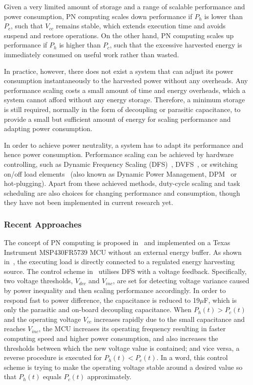 Given a very limited amount of storage and a range of scalable performance and power consumption, PN computing scales down performance if $P_h$ is lower than $P_c$, such that $V_{cc}$ remains stable, which extends execution time and avoids suspend and restore operations. On the other hand, PN computing scales up performance if $P_h$ is higher than $P_c$, such that the excessive harvested energy is immediately consumed on useful work rather than wasted.

In practice, however, there does not exist a system that can adjust its power consumption instantaneously to the harvested power without any overheads. Any performance scaling costs a small amount of time and energy overheads, which a system cannot afford without any energy storage. Therefore, a minimum storage is still required, normally in the form of decoupling or parasitic capacitance, to provide a small but sufficient amount of energy for scaling performance and adapting power consumption.

In order to achieve power neutrality, a system has to adapt its performance and hence power consumption. Performance scaling can be achieved by hardware controlling, such as Dynamic Frequency Scaling (DFS)~\cite{balsamo2016graceful}, DVFS~\cite{fletcher2017power}, or switching on/off load elements~\cite{wang2016storage, fletcher2017power} (also known as Dynamic Power Management, DPM~\cite{lu2000low} or hot-plugging). Apart from these achieved methods, duty-cycle scaling and task scheduling are also choices for changing performance and consumption, though they have not been implemented in current research yet.

\subsubsection{Recent Approaches}

The concept of PN computing is proposed in~\cite{balsamo2016graceful} and implemented on a Texas Instrument MSP430FR5739 MCU without an external energy buffer. As shown in~, the executing load is directly connected to a regulated energy harvesting source. The control scheme in~\cite{balsamo2016graceful} utilises DFS with a voltage feedback. Specifically, two voltage thresholds, $V_{dec}$ and $V_{inc}$, are set for detecting voltage variance caused by power inequality and then scaling performance accordingly. In order to respond fast to power difference, the capacitance is reduced to 19$\mu$F, which is only the parasitic and on-board decoupling capacitance. When $P_h(t) > P_c(t)$ and the operating voltage $V_{cc}$ increases rapidly due to the small capacitance and reaches $V_{inc}$, the MCU increases its operating frequency resulting in faster computing speed and higher power consumption, and also increases the thresholds between which the new voltage value is contained; and vice versa, a reverse procedure is executed for $P_h(t) < P_c(t)$. In a word, this control scheme is trying to make the operating voltage stable around a desired value so that $P_h(t)$  equals $P_c(t)$ approximately.

